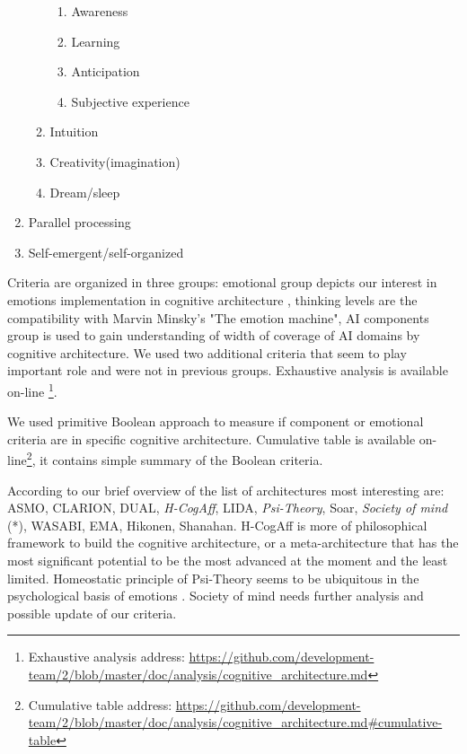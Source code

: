 \begin{enumerate}
\begin{enumerate}
  \begin{enumerate}
   \item  Awareness
   \item  Learning
   \item  Anticipation
   \item  Subjective experience
  \end{enumerate}
  \item  Intuition
  \item  Creativity(imagination)
  \item  Dream/sleep
 \end{enumerate}
 \item  Parallel processing
 \item  Self-emergent/self-organized
\end{enumerate}

Criteria are organized in three groups: emotional group depicts our interest in emotions implementation in cognitive architecture \cite{computationalmodelsemotionscognition}, thinking levels are the compatibility with Marvin Minsky's "The emotion machine", AI components group is used to gain understanding of width of coverage of AI domains by cognitive architecture. We used two additional criteria that seem to play important role and were not in previous groups. Exhaustive analysis is available on-line \footnote{Exhaustive analysis address: \url{https://github.com/development-team/2/blob/master/doc/analysis/cognitive_architecture.md}}.

We used primitive Boolean approach to measure if component or emotional criteria are in specific cognitive architecture. Cumulative table is available on-line\footnote{Cumulative table address: \url{https://github.com/development-team/2/blob/master/doc/analysis/cognitive_architecture.md#cumulative-table}}, it contains simple summary of the Boolean criteria.

According to our brief overview of the list of architectures most interesting are: ASMO, CLARION, DUAL, \emph{H-CogAff}, LIDA, \emph{Psi-Theory}, Soar, \emph{Society of mind} (*), WASABI, EMA, Hikonen, Shanahan.
H-CogAff is more of philosophical framework to build the cognitive architecture, or a meta-architecture that has the most significant potential to be the most advanced at the moment and the least limited. Homeostatic principle of Psi-Theory seems to be ubiquitous in the psychological basis of emotions \cite{natureofemotions}. Society of mind needs further analysis and possible update of our criteria.

